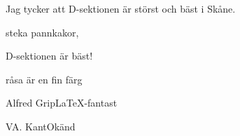 \documentclass{dsekmotion}
\begin{document}
\setdate{\today}


Jag tycker att D-sektionen är störst och bäst i Skåne.

\usedemand

\begin{attlist}
    \item steka pannkakor,
    \item D-sektionen är bäst!
    \item råsa är en fin färg
\end{attlist}

\signature{För D-sektionen}{Alfred Grip}{\LaTeX -fantast}
\signature{\phantom{}}{VA. Kant}{Okänd}
\end{document}
